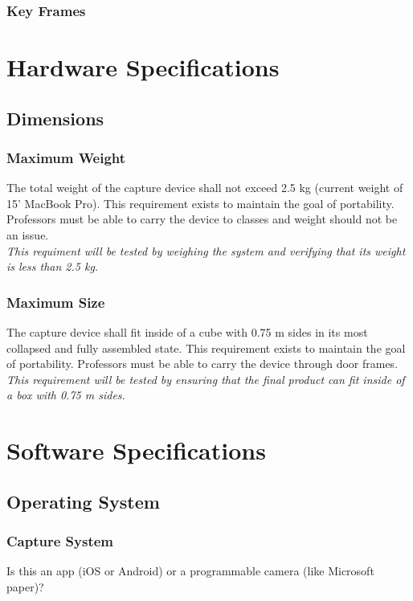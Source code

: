 \documentclass[]{article}
\begin{document}
			\subsubsection{Key Frames}
			
			
	
	\section{Hardware Specifications}
		
		\subsection{Dimensions}
			
			\subsubsection{Maximum Weight}
				The total weight of the capture device shall not exceed 2.5 kg (current weight of 15' MacBook Pro). This requirement exists to maintain the goal of portability. Professors must be able to carry the device to classes and weight should not be an issue. \\
				\emph{This requiment will be tested by weighing the system and verifying that its weight is less than 2.5 kg.}
				
			\subsubsection{Maximum Size}
				The capture device shall fit inside of a cube with 0.75 m sides in its most collapsed and fully assembled state. This requirement exists to maintain the goal of portability. Professors must be able to carry the device through door frames. \\
				\emph{This requirement will be tested by ensuring that the final product can fit inside of a box with 0.75 m sides.}
			
	
	\section{Software Specifications}
	
		\subsection{Operating System}
			
			\subsubsection{Capture System}
				Is this an app (iOS or Android) or a programmable camera (like Microsoft paper)?
				
\end{document}
